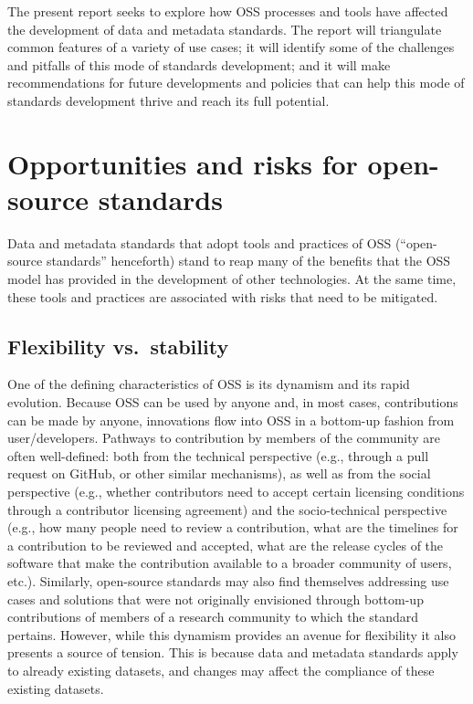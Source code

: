 \documentclass[
  letterpaper,
  DIV=11,
  numbers=noendperiod]{scrartcl}
\begin{document}
The present report seeks to explore how OSS processes and tools have
affected the development of data and metadata standards. The report will
triangulate common features of a variety of use cases; it will identify
some of the challenges and pitfalls of this mode of standards
development; and it will make recommendations for future developments
and policies that can help this mode of standards development thrive and
reach its full potential.

\section{Opportunities and risks for open-source
standards}\label{opportunities-and-risks-for-open-source-standards}

Data and metadata standards that adopt tools and practices of OSS
(``open-source standards'' henceforth) stand to reap many of the
benefits that the OSS model has provided in the development of other
technologies. At the same time, these tools and practices are associated
with risks that need to be mitigated.

\subsection{Flexibility vs.~stability}\label{flexibility-vs.-stability}

One of the defining characteristics of OSS is its dynamism and its rapid
evolution. Because OSS can be used by anyone and, in most cases,
contributions can be made by anyone, innovations flow into OSS in a
bottom-up fashion from user/developers. Pathways to contribution by
members of the community are often well-defined: both from the technical
perspective (e.g., through a pull request on GitHub, or other similar
mechanisms), as well as from the social perspective (e.g., whether
contributors need to accept certain licensing conditions through a
contributor licensing agreement) and the socio-technical perspective
(e.g., how many people need to review a contribution, what are the
timelines for a contribution to be reviewed and accepted, what are the
release cycles of the software that make the contribution available to a
broader community of users, etc.). Similarly, open-source standards may
also find themselves addressing use cases and solutions that were not
originally envisioned through bottom-up contributions of members of a
research community to which the standard pertains. However, while this
dynamism provides an avenue for flexibility it also presents a source of
tension. This is because data and metadata standards apply to already
existing datasets, and changes may affect the compliance of these
existing datasets.
\end{document}
